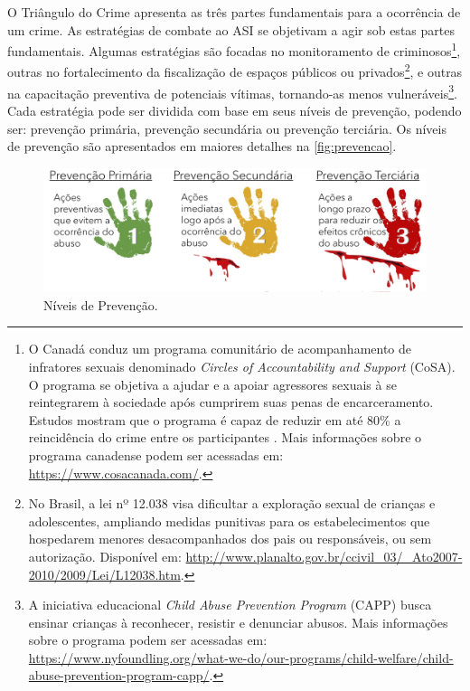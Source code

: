 O Triângulo do Crime apresenta as três partes fundamentais para a ocorrência de um crime. As estratégias de combate ao \ac{ASI} se objetivam a agir sob estas partes fundamentais. Algumas estratégias são focadas no monitoramento de criminosos\footnote{\label{note:nota1}O Canadá conduz um programa comunitário de acompanhamento de infratores sexuais denominado \textit{Circles of Accountability and Support} (CoSA). O programa se objetiva a ajudar e a apoiar agressores sexuais à se reintegrarem à sociedade após cumprirem suas penas de encarceramento. Estudos mostram que o programa é capaz de reduzir em até 80\% a reincidência do crime entre os participantes \cite{wilson2009circles}. Mais informações sobre o programa canadense podem ser acessadas em: \url{https://www.cosacanada.com/}.}, outras no fortalecimento da fiscalização de espaços públicos ou privados\footnote{No Brasil, a lei nº 12.038 visa dificultar a exploração sexual de crianças e adolescentes, ampliando medidas punitivas para os estabelecimentos que hospedarem menores desacompanhados dos pais ou responsáveis, ou sem autorização. Disponível em: \url{http://www.planalto.gov.br/ccivil_03/_Ato2007-2010/2009/Lei/L12038.htm}.}, e outras na capacitação preventiva de potenciais vítimas, tornando-as menos vulneráveis\footnote{A iniciativa educacional \textit{Child Abuse Prevention Program} (CAPP) busca ensinar crianças à reconhecer, resistir e denunciar abusos. Mais informações sobre o programa podem ser acessadas em: \url{https://www.nyfoundling.org/what-we-do/our-programs/child-welfare/child-abuse-prevention-program-capp/}.}. Cada estratégia pode ser dividida com base em seus níveis de prevenção, podendo ser: prevenção primária, prevenção secundária ou prevenção terciária. Os níveis de prevenção são apresentados em maiores detalhes na \autoref{fig:prevencao}.


\begin{figure}[htb]
	\caption{\label{fig:prevencao}Níveis de Prevenção.}
    \vspace{0.4cm}
    \hspace{-0.75cm}\includegraphics[width=1.1\linewidth]{./Visuais/Prevencao.pdf}

\end{figure}

